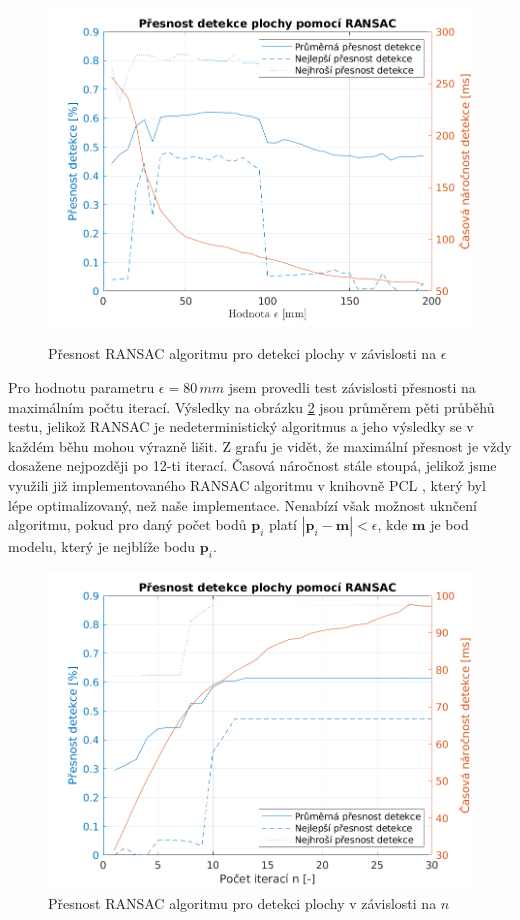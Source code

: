 \documentclass[twoside]{ctuthesis}
\newcommand{\tl}[1]{$\mathbf{#1}$}
\begin{document}
\begin{figure}
  \centering
  \includegraphics[width=\linewidth]{pictures/plane_ransac.png}
  \label{subfig:epsilon}
  \caption{Přesnost RANSAC algoritmu pro detekci plochy v závislosti na $\epsilon$}
\label{fig:plane_ransac}
\end{figure}

Pro hodnotu parametru $\epsilon = 80\,mm$ jsem provedli test závislosti přesnosti na maximálním počtu iterací. Výsledky na obrázku \ref{fig:ransac_max_iter} jsou průměrem pěti průběhů testu, jelikož RANSAC je nedeterministický algoritmus a jeho výsledky se v každém běhu mohou výrazně lišit. Z grafu je vidět, že maximální přesnost je vždy dosažene nejpozději po 12-ti iterací. Časová náročnost stále stoupá, jelikož jsme využili již implementovaného RANSAC algoritmu v knihovně PCL \cite{pcl}, který byl lépe optimalizovaný, než naše implementace. Nenabízí však možnost uknčení algoritmu, pokud pro daný počet bodů $\mathbf{p}_i$ platí $|\mathbf{p}_i - \mathbf{m}| < \epsilon$, kde \tl{m} je bod modelu, který je nejblíže bodu $\mathbf{p}_i$.

\begin{figure}
    \centering
    \includegraphics[width =\linewidth]{pictures/plane_ransac_iter.png}
    \caption{Přesnost RANSAC algoritmu pro detekci plochy v závislosti na $n$}
    \label{fig:ransac_max_iter}
\end{figure}
\end{document}
